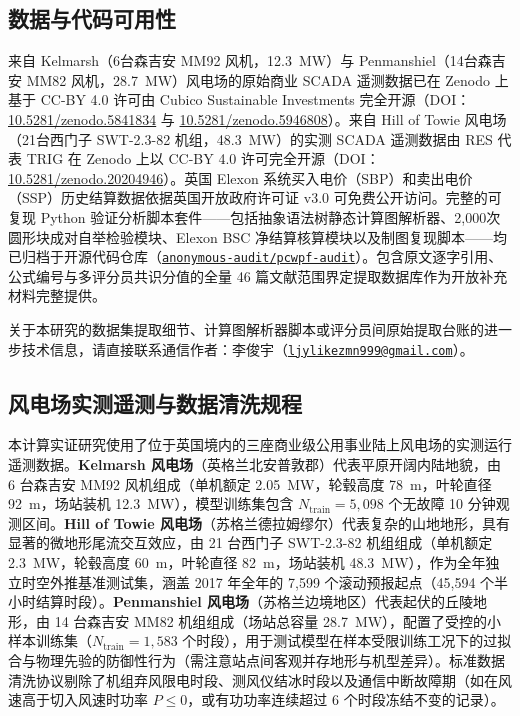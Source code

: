\subsection{数据与代码可用性}
来自 Kelmarsh（6台森吉安 MM92 风机，12.3~MW）与 Penmanshiel（14台森吉安 MM82 风机，28.7~MW）风电场的原始商业 SCADA 遥测数据已在 Zenodo 上基于 CC-BY 4.0 许可由 Cubico Sustainable Investments 完全开源（DOI：\href{https://doi.org/10.5281/zenodo.5841834}{10.5281/zenodo.5841834} 与 \href{https://doi.org/10.5281/zenodo.5946808}{10.5281/zenodo.5946808}）。来自 Hill of Towie 风电场（21台西门子 SWT-2.3-82 机组，48.3~MW）的实测 SCADA 遥测数据由 RES 代表 TRIG 在 Zenodo 上以 CC-BY 4.0 许可完全开源（DOI：\href{https://doi.org/10.5281/zenodo.20204946}{10.5281/zenodo.20204946}）。英国 Elexon 系统买入电价（SBP）和卖出电价（SSP）历史结算数据依据英国开放政府许可证 v3.0 可免费公开访问。完整的可复现 Python 验证分析脚本套件——包括抽象语法树静态计算图解析器、2,000次圆形块成对自举检验模块、Elexon BSC 净结算核算模块以及制图复现脚本——均已归档于开源代码仓库（\href{https://github.com/anonymous-audit/pcwpf-audit}{\texttt{anonymous-audit/pcwpf-audit}}）。包含原文逐字引用、公式编号与多评分员共识分值的全量 46 篇文献范围界定提取数据库作为开放补充材料完整提供。

关于本研究的数据集提取细节、计算图解析器脚本或评分员间原始提取台账的进一步技术信息，请直接联系通信作者：李俊宇（\href{mailto:ljylikezmn999@gmail.com}{\texttt{ljylikezmn999@gmail.com}}）。

\subsection{风电场实测遥测与数据清洗规程}
本计算实证研究使用了位于英国境内的三座商业级公用事业陆上风电场的实测运行遥测数据。\textbf{Kelmarsh 风电场}（英格兰北安普敦郡）代表平原开阔内陆地貌，由 6 台森吉安 MM92 风机组成（单机额定 2.05~MW，轮毂高度 78~m，叶轮直径 92~m，场站装机 12.3~MW），模型训练集包含 $N_{\text{train}} = 5,098$ 个无故障 10 分钟观测区间。\textbf{Hill of Towie 风电场}（苏格兰德拉姆缪尔）代表复杂的山地地形，具有显著的微地形尾流交互效应，由 21 台西门子 SWT-2.3-82 机组组成（单机额定 2.3~MW，轮毂高度 60~m，叶轮直径 82~m，场站装机 48.3~MW），作为全年独立时空外推基准测试集，涵盖 2017 年全年的 7,599 个滚动预报起点（45,594 个半小时结算时段）。\textbf{Penmanshiel 风电场}（苏格兰边境地区）代表起伏的丘陵地形，由 14 台森吉安 MM82 机组组成（场站总容量 28.7~MW），配置了受控的小样本训练集（$N_{\text{train}} = 1,583$ 个时段），用于测试模型在样本受限训练工况下的过拟合与物理先验的防御性行为（需注意站点间客观并存地形与机型差异）。标准数据清洗协议剔除了机组弃风限电时段、测风仪结冰时段以及通信中断故障期（如在风速高于切入风速时功率 $P \le 0$，或有功功率连续超过 6 个时段冻结不变的记录）。

